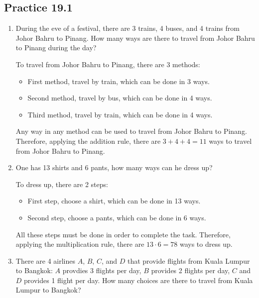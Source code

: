 \documentclass{report}
\begin{document}
\begin{multicols}{2}
  \subsection{Practice 19.1}
  \begin{enumerate}
    \item During the eve of a festival, there are 3 trains, 4 buses, and 4 trains from
          Johor Bahru to Pinang. How many ways are there to travel from Johor Bahru to
          Pinang during the day? \sol{}

          To travel from Johor Bahru to Pinang, there are 3 methods:
          \begin{itemize}
            \item First method, travel by train, which can be done in 3 ways.
            \item Second method, travel by bus, which can be done in 4 ways.
            \item Third method, travel by train, which can be done in 4 ways.
          \end{itemize}
          Any way in any method can be used to travel from Johor Bahru to Pinang. Therefore, applying the addition rule, there are $3 + 4 + 4 = 11$ ways to travel from Johor Bahru to Pinang.

    \item One has 13 shirts and 6 pants, how many ways can he dress up? \sol{}

          To dress up, there are 2 steps:
          \begin{itemize}
            \item First step, choose a shirt, which can be done in 13 ways.
            \item Second step, choose a pants, which can be done in 6 ways.
          \end{itemize}
          All these steps must be done in order to complete the task. Therefore, applying the multiplication rule, there are $13 \cdot 6 = 78$ ways to dress up.

    \item There are 4 airlines $A$, $B$, $C$, and $D$ that provide flights from Kuala
          Lumpur to Bangkok: $A$ provdies 3 flights per day, $B$ provides 2 flights per
          day, $C$ and $D$ provides 1 flight per day. How many choices are there to
          travel from Kuala Lumpur to Bangkok? \sol{}


\end{enumerate}
\end{multicols}
\end{document}
